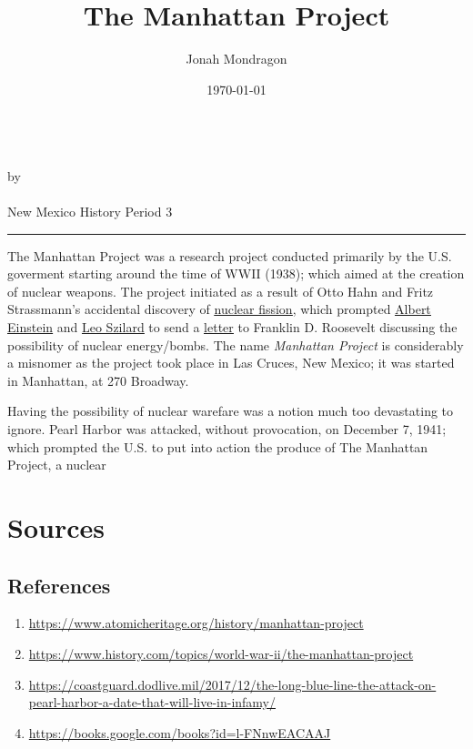 \documentclass[12pt]{article}
\newcommand{\PutTitle}[1]
{
    \begin{center}
        {\huge\bfseries\thetitle}\\
        by \theauthor\\
        \thedate\\
        #1
    \end{center}
    \hrule
    \vspace{2ex}
}
\begin{document}
\title{The Manhattan Project}
\author{Jonah Mondragon}
\date{\today}
\PutTitle{New Mexico History Period 3}

\pagestyle{headings}
\thispagestyle{empty}
\doublespacing

The Manhattan Project was a research project conducted primarily by the U.S. goverment starting around the time of WWII (1938); which aimed at the creation of nuclear weapons.
The project initiated as a result of Otto Hahn and Fritz Strassmann's accidental discovery of {\color{blue}\underline{\href{http://nuclearconnect.org/know-nuclear/science/nuclear-fission}{nuclear fission}}},
    which prompted {\color{blue}\underline{\href{https://www.nobelprize.org/prizes/physics/1921/einstein/biographical/}{Albert Einstein}}} and {\color{blue}\underline{\href{https://www.jewishvirtuallibrary.org/leo-szilard}{Leo Szilard}}} to send a 
    {\color{blue}\underline{\href{https://www.osti.gov/opennet/manhattan-project-history/Events/1939-1942/einstein_letter.htm}{letter}}} to Franklin D. Roosevelt discussing the possibility of nuclear energy/bombs.
The name \textit{Manhattan Project} is considerably a misnomer as the project took place in Las Cruces, New Mexico; it was started in Manhattan, at 270 Broadway.

Having the possibility of nuclear warefare was a notion much too devastating to ignore.
Pearl Harbor was attacked, without provocation, on December 7, 1941; which prompted the U.S. to put into action the produce of The Manhattan Project, a nuclear

\newpage

\section*{Sources}
\subsection*{References}
\begin{enumerate}
    \item{\url{https://www.atomicheritage.org/history/manhattan-project}}
    \item{\url{https://www.history.com/topics/world-war-ii/the-manhattan-project}}
    \item{\url{https://coastguard.dodlive.mil/2017/12/the-long-blue-line-the-attack-on-pearl-harbor-a-date-that-will-live-in-infamy/}}
    \item{\url{https://books.google.com/books?id=l-FNnwEACAAJ}}
\end{enumerate}
\end{document}
